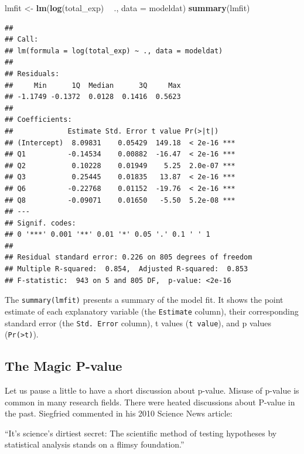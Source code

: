 \documentclass[12pt,]{krantz}
\makeatletter
\newenvironment{Shaded}{\begin{snugshade}}{\end{snugshade}}
\newcommand{\DataTypeTok}[1]{\textcolor[rgb]{0.27,0.27,0.27}{#1}}
\newcommand{\KeywordTok}[1]{\textcolor[rgb]{0.27,0.27,0.27}{\textbf{#1}}}
\newcommand{\NormalTok}[1]{#1}
\newcommand{\OperatorTok}[1]{\textcolor[rgb]{0.43,0.43,0.43}{\textbf{#1}}}
\newcommand{\StringTok}[1]{\textcolor[rgb]{0.5,0.5,0.5}{#1}}
\renewenvironment{quote}{\begin{VF}}{\end{VF}}
\newenvironment{kframe}{%
\medskip{}
\setlength{\fboxsep}{.8em}
 \def\at@end@of@kframe{}%
 \ifinner\ifhmode%
  \def\at@end@of@kframe{\end{minipage}}%
  \begin{minipage}{\columnwidth}%
 \fi\fi%
 \def\FrameCommand##1{\hskip\@totalleftmargin \hskip-\fboxsep
 \colorbox{shadecolor}{##1}\hskip-\fboxsep
     \hskip-\linewidth \hskip-\@totalleftmargin \hskip\columnwidth}%
 \MakeFramed {\advance\hsize-\width
   \@totalleftmargin\z@ \linewidth\hsize
   \@setminipage}}%
 {\par\unskip\endMakeFramed%
 \at@end@of@kframe}
\renewenvironment{Shaded}{\begin{kframe}}{\end{kframe}}
\makeatother
\begin{document}
\begin{Shaded}
\begin{Highlighting}[]
\NormalTok{lmfit <-}\StringTok{ }\KeywordTok{lm}\NormalTok{(}\KeywordTok{log}\NormalTok{(total_exp) }\OperatorTok{~}\StringTok{ }\NormalTok{., }\DataTypeTok{data =}\NormalTok{ modeldat)}
\KeywordTok{summary}\NormalTok{(lmfit)}
\end{Highlighting}
\end{Shaded}

\begin{verbatim}
## 
## Call:
## lm(formula = log(total_exp) ~ ., data = modeldat)
## 
## Residuals:
##     Min      1Q  Median      3Q     Max 
## -1.1749 -0.1372  0.0128  0.1416  0.5623 
## 
## Coefficients:
##             Estimate Std. Error t value Pr(>|t|)    
## (Intercept)  8.09831    0.05429  149.18  < 2e-16 ***
## Q1          -0.14534    0.00882  -16.47  < 2e-16 ***
## Q2           0.10228    0.01949    5.25  2.0e-07 ***
## Q3           0.25445    0.01835   13.87  < 2e-16 ***
## Q6          -0.22768    0.01152  -19.76  < 2e-16 ***
## Q8          -0.09071    0.01650   -5.50  5.2e-08 ***
## ---
## Signif. codes:  
## 0 '***' 0.001 '**' 0.01 '*' 0.05 '.' 0.1 ' ' 1
## 
## Residual standard error: 0.226 on 805 degrees of freedom
## Multiple R-squared:  0.854,	Adjusted R-squared:  0.853 
## F-statistic:  943 on 5 and 805 DF,  p-value: <2e-16
\end{verbatim}

The \texttt{summary(lmfit)} presents a summary of the model fit. It shows the point estimate of each explanatory variable (the \texttt{Estimate} column), their corresponding standard error (the \texttt{Std.\ Error} column), t values (\texttt{t\ value}), and p values (\texttt{Pr(\textgreater{}\textbar{}t\textbar{})}).

\hypertarget{the-magic-p-value}{%
\subsection{The Magic P-value}\label{the-magic-p-value}}

Let us pause a little to have a short discussion about p-value. Misuse of p-value is common in many research fields. There were heated discussions about P-value in the past. Siegfried commented in his 2010 Science News article: 

\begin{quote}
``It's science's dirtiest secret: The scientific method of testing hypotheses by statistical analysis stands on a flimsy foundation.''
\end{quote}
\end{document}
